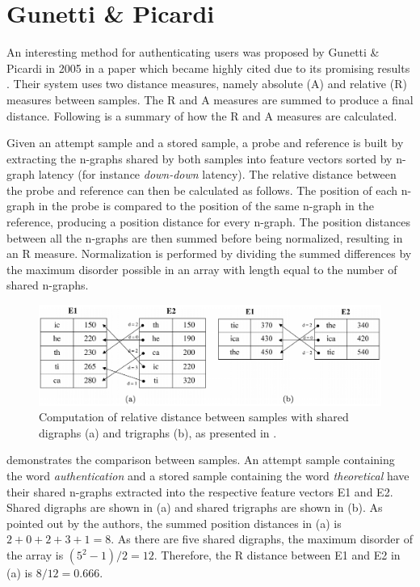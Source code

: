 \documentclass[informationsecurity]{gucmasterproject}
\begin{document}


\chapter{Gunetti \& Picardi}
\label{chap:gnp}
An interesting method for authenticating users was proposed by Gunetti \& Picardi in 2005 in a paper which became highly cited due to its promising results \cite{gnp}.
Their system uses two distance measures, namely absolute (A) and relative (R) measures between samples.
The R and A measures are summed to produce a final distance.
Following is a summary of how the R and A measures are calculated.

Given an attempt sample and a stored sample, a probe and reference is built by extracting the n-graphs shared by both samples into feature vectors sorted by n-graph latency (for instance \textit{down-down} latency).
The relative distance between the probe and reference can then be calculated as follows.
The position of each n-graph in the probe is compared to the position of the same n-graph in the reference, producing a position distance for every n-graph.
The position distances between all the n-graphs are then summed before being normalized, resulting in an R measure.
Normalization is performed by dividing the summed differences by the maximum disorder possible in an array with length equal to the number of shared n-graphs.

\begin{figure}[h]
    \centering
    \includegraphics[width=1\textwidth]{gunetti/R-measure}
    \caption{Computation of relative distance between samples with shared digraphs (a) and trigraphs (b), as presented in \cite{gnp}.}
    \label{fig:R-measure}
\end{figure}

 demonstrates the comparison between samples.
An attempt sample containing the word \textit{authentication} and a stored sample containing the word \textit{theoretical} have their shared n-graphs extracted into the respective feature vectors E1 and E2.
Shared digraphs are shown in (a) and shared trigraphs are shown in (b). 
As pointed out by the authors, the summed position distances in (a) is $2+0+2+3+1=8$.
As there are five shared digraphs, the maximum disorder of the array is $(5^2-1)/2=12$.
Therefore, the R distance between E1 and E2 in (a) is $8/12 = 0.666$.
\end{document}
